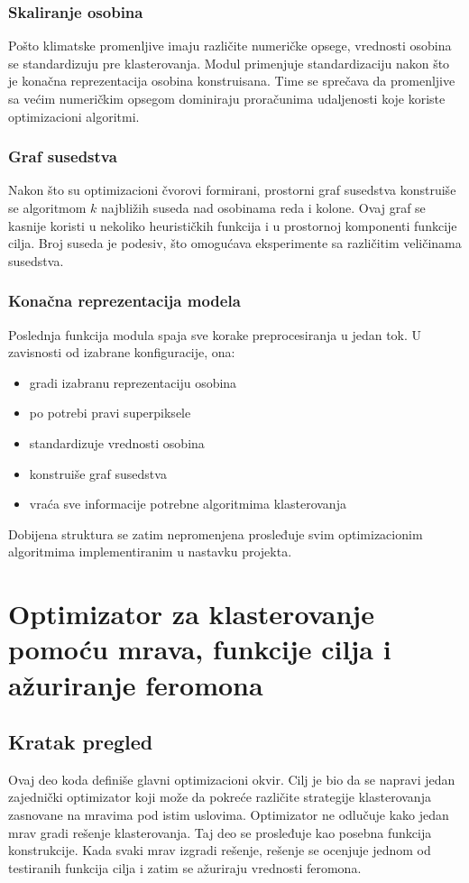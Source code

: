 \documentclass[11pt]{article}
\begin{document}
\subsubsection{Skaliranje osobina}
Pošto klimatske promenljive imaju različite numeričke opsege, vrednosti osobina se standardizuju pre klasterovanja. Modul primenjuje standardizaciju nakon što je konačna reprezentacija osobina konstruisana. Time se sprečava da promenljive sa većim numeričkim opsegom dominiraju proračunima udaljenosti koje koriste optimizacioni algoritmi.

\subsubsection{Graf susedstva}
Nakon što su optimizacioni čvorovi formirani, prostorni graf susedstva konstruiše se algoritmom $k$ najbližih suseda nad osobinama reda i kolone. Ovaj graf se kasnije koristi u nekoliko heurističkih funkcija i u prostornoj komponenti funkcije cilja. Broj suseda je podesiv, što omogućava eksperimente sa različitim veličinama susedstva.

\subsubsection{Konačna reprezentacija modela}
Poslednja funkcija modula spaja sve korake preprocesiranja u jedan tok. U zavisnosti od izabrane konfiguracije, ona:
\begin{itemize}
  \item gradi izabranu reprezentaciju osobina
  \item po potrebi pravi superpiksele
  \item standardizuje vrednosti osobina
  \item konstruiše graf susedstva
  \item vraća sve informacije potrebne algoritmima klasterovanja
\end{itemize}
Dobijena struktura se zatim nepromenjena prosleđuje svim optimizacionim algoritmima implementiranim u nastavku projekta.

\section{Optimizator za klasterovanje pomoću mrava, funkcije cilja i ažuriranje feromona}
\label{sec:framework}

\subsection{Kratak pregled}
Ovaj deo koda definiše glavni optimizacioni okvir. Cilj je bio da se napravi jedan zajednički optimizator koji može da pokreće različite strategije klasterovanja zasnovane na mravima pod istim uslovima. Optimizator ne odlučuje kako jedan mrav gradi rešenje klasterovanja. Taj deo se prosleđuje kao posebna funkcija konstrukcije. Kada svaki mrav izgradi rešenje, rešenje se ocenjuje jednom od testiranih funkcija cilja i zatim se ažuriraju vrednosti feromona.
\end{document}
